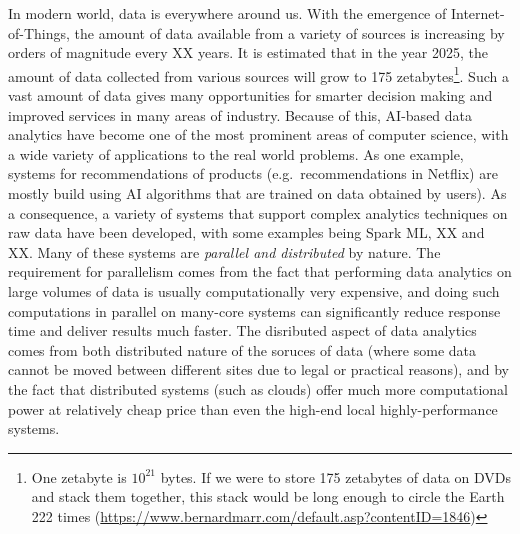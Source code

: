 \documentclass[a4paper,11pt]{article}
\begin{document}
In modern world, data is everywhere around us. With the emergence of Internet-of-Things, the amount of data available from a variety of sources is increasing by orders of magnitude every XX years. It is estimated that in the year 2025, the amount of data collected from various sources will grow to 175 zetabytes\footnote{One zetabyte is $10^{21}$ bytes. If we were to store 175 zetabytes of data on DVDs and stack them together, this stack would be long enough to circle the Earth 222 times (\url{https://www.bernardmarr.com/default.asp?contentID=1846})}. Such a vast amount of data gives many opportunities for smarter decision making and improved services in many areas of industry. Because of this, AI-based data analytics have become one of the most prominent areas of computer science, with a wide variety of applications to the real world problems. As one example, systems for recommendations of products (e.g.~recommendations in Netflix) are mostly build using AI algorithms that are trained on data obtained by users). As a consequence, a variety of systems that support complex analytics techniques on raw data have been developed, with some examples being Spark ML, XX and XX. Many of these systems are \emph{parallel and distributed} by nature. The requirement for parallelism comes from the fact that performing data analytics on large volumes of data is usually computationally very expensive, and doing such computations in parallel on many-core systems can significantly reduce response time and deliver results much faster. The disributed aspect of data analytics comes from both distributed nature of the soruces of data (where some data cannot be moved between different sites due to legal or practical reasons), and by the fact that distributed systems (such as clouds) offer much more computational power at relatively cheap price than even the high-end local highly-performance systems. 
\end{document}
